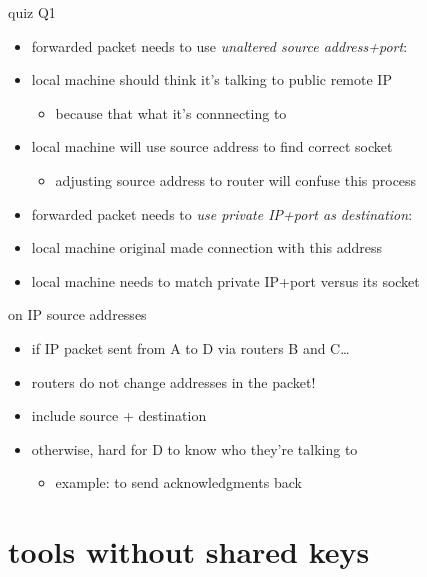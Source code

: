 \begin{frame}{quiz Q1}
    \begin{itemize}
    \item forwarded packet needs to use \textit{unaltered source address+port}:
    \item local machine should think it's talking to public remote IP
        \begin{itemize}
        \item because that what it's connnecting to
        \end{itemize}
    \item local machine will use source address to find correct socket
        \begin{itemize}
        \item adjusting source address to router will confuse this process
        \end{itemize}
    \vspace{.5cm}
    \item forwarded packet needs to \textit{use private IP+port as destination}:
    \item local machine original made connection with this address
    \item local machine needs to match private IP+port versus its socket
    \end{itemize}
\end{frame}

\begin{frame}{on IP source addresses}
    \begin{itemize}
    \item if IP packet sent from A to D via routers B and C\ldots
    \item routers do not change addresses in the packet!
    \item include source + destination
    \vspace{.5cm}
    \item otherwise, hard for D to know who they're talking to
        \begin{itemize}
        \item example: to send acknowledgments back
        \end{itemize}
    \end{itemize}
\end{frame}

\section{tools without shared keys}


